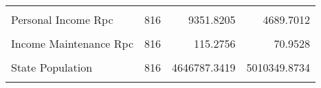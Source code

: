 \begin{table}[H]
\begin{tabular}[t]{lrrr}
\cellcolor{gray!6}{Autotheft Crime Rate} & \cellcolor{gray!6}{816} & \cellcolor{gray!6}{410.2951} & \cellcolor{gray!6}{231.1537}\\
Personal Income Rpc & 816 & 9351.8205 & 4689.7012\\
\addlinespace
\cellcolor{gray!6}{Unemployment Insurance Rpc} & \cellcolor{gray!6}{816} & \cellcolor{gray!6}{50.0187} & \cellcolor{gray!6}{38.0808}\\
Income Maintenance Rpc & 816 & 115.2756 & 70.9528\\
\cellcolor{gray!6}{Retirement Payments Rpc} & \cellcolor{gray!6}{816} & \cellcolor{gray!6}{1002.2257} & \cellcolor{gray!6}{546.4679}\\
State Population & 816 & 4646787.3419 & 5010349.8734\\
\cellcolor{gray!6}{Density} & \cellcolor{gray!6}{816} & \cellcolor{gray!6}{355.9729} & \cellcolor{gray!6}{1408.2501}\\
\bottomrule
\end{tabular}
\end{table}
